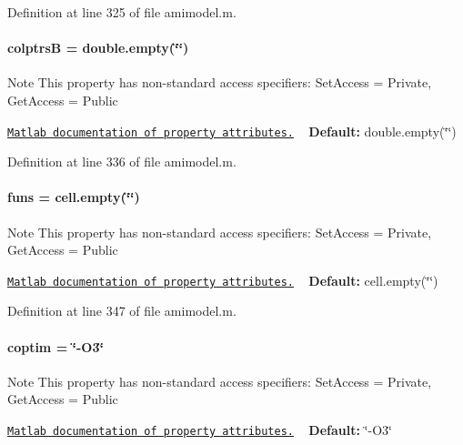 Definition at line 325 of file amimodel.\+m.

\hypertarget{classamimodel_a3a4891c5565b544dd7d4362dbbfaadf7}{}
\paragraph[{colptrs\+B}]{\setlength{\rightskip}{0pt plus 5cm}colptrs\+B = double.\+empty(\char`\"{}\char`\"{})}\label{classamimodel_a3a4891c5565b544dd7d4362dbbfaadf7}
\begin{DoxyNote}{Note}
This property has non-\/standard access specifiers\+: {\ttfamily Set\+Access = Private, Get\+Access = Public} 

\href{http://www.mathworks.com/help/matlab/matlab_oop/property-attributes.html}{\tt Matlab documentation of property attributes.} ~\newline
{\bfseries Default\+:} double.\+empty(\char`\"{}\char`\"{}) 
\end{DoxyNote}


Definition at line 336 of file amimodel.\+m.

\hypertarget{classamimodel_af80b2560853c3df2b09fef2a198cf5b8}{}
\paragraph[{funs}]{\setlength{\rightskip}{0pt plus 5cm}funs = cell.\+empty(\char`\"{}\char`\"{})}\label{classamimodel_af80b2560853c3df2b09fef2a198cf5b8}
\begin{DoxyNote}{Note}
This property has non-\/standard access specifiers\+: {\ttfamily Set\+Access = Private, Get\+Access = Public} 

\href{http://www.mathworks.com/help/matlab/matlab_oop/property-attributes.html}{\tt Matlab documentation of property attributes.} ~\newline
{\bfseries Default\+:} cell.\+empty(\char`\"{}\char`\"{}) 
\end{DoxyNote}


Definition at line 347 of file amimodel.\+m.

\hypertarget{classamimodel_ad99abcd270ac97546c46292ebc6c2e0a}{}
\paragraph[{coptim}]{\setlength{\rightskip}{0pt plus 5cm}coptim = \char`\"{}-\/O3\char`\"{}}\label{classamimodel_ad99abcd270ac97546c46292ebc6c2e0a}
\begin{DoxyNote}{Note}
This property has non-\/standard access specifiers\+: {\ttfamily Set\+Access = Private, Get\+Access = Public} 

\href{http://www.mathworks.com/help/matlab/matlab_oop/property-attributes.html}{\tt Matlab documentation of property attributes.} ~\newline
{\bfseries Default\+:} \char`\"{}-\/\+O3\char`\"{} 
\end{DoxyNote}


